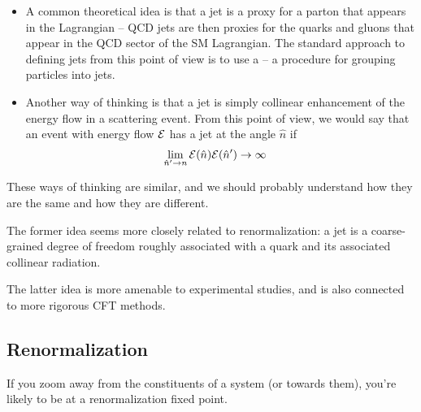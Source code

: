 \begin{itemize}
    \item
    A common theoretical idea is that a jet is a proxy for a parton that appears in the Lagrangian -- QCD jets are then proxies for the quarks and gluons that appear in the QCD sector of the SM Lagrangian.
    The standard approach to defining jets from this point of view is to use a  -- a procedure for grouping particles into jets.

    \item
    Another way of thinking is that a jet is simply collinear enhancement of the energy flow in a scattering event.
    From this point of view, we would say that an event with energy flow \(\mathcal{E}\) has a jet at the angle \(\hat n\) if
    \begin{align}
        \lim_{\hat n' \to n}\mathcal{E}(\hat n) \mathcal{E}(\hat n') &\to \infty
    \end{align}
\end{itemize}
%
These ways of thinking are similar, and we should probably understand how they are the same and how they are different.


The former idea seems more closely related to renormalization:
%
a jet is a coarse-grained degree of freedom roughly associated with a quark and its associated collinear radiation.

The latter idea is more amenable to experimental studies, and is also connected to more rigorous CFT methods.


\subsection{Renormalization}

If you zoom away from the constituents of a system (or towards them), you're likely to be at a renormalization fixed point.
%
%


